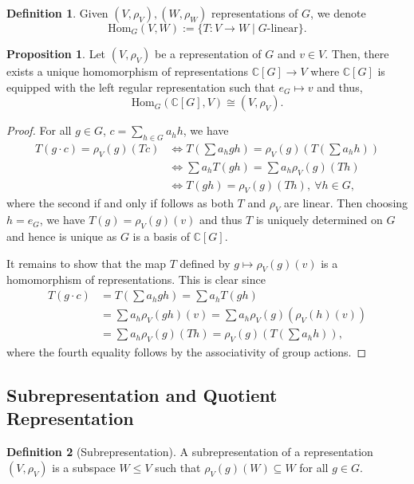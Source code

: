 \documentclass[]{article}
\theoremstyle{definition}
\theoremstyle{definition}
\newtheorem{definition}{Definition}[section]
\newtheorem{proposition}{Proposition}[section]
\begin{document}
\begin{definition}
  Given \((V, \rho_V), (W, \rho_W)\) representations of \(G\), we denote 
  \[\text{Hom}_G(V, W) := \{T : V \to W \mid G\text{-linear}\}.\]
\end{definition}

\begin{proposition}
  Let \((V, \rho_V)\) be a representation of \(G\) and \(v \in V\). Then, 
  there exists a unique homomorphism of representations 
  \(\mathbb{C}[G] \to V\) where \(\mathbb{C}[G]\) is equipped with the left 
  regular representation such that \(e_G \mapsto v\) and thus, 
  \[\text{Hom}_G(\mathbb{C}[G], V) \cong (V, \rho_V).\]
\end{proposition}
\begin{proof}
  For all \(g \in G\), \(c = \sum_{h \in G} a_h h\), we have 
  \[\begin{split}
    T(g \cdot c) = \rho_V(g)(Tc) 
    & \iff T\left(\sum a_h gh\right) = 
      \rho_V(g)\left(T\left(\sum a_h h\right)\right)\\
    & \iff \sum a_h T(gh) = \sum a_h \rho_V(g)(Th)\\
    & \iff T(gh) = \rho_V(g)(Th), \ \forall h \in G,
  \end{split}\]
  where the second if and only if follows as both \(T\) and \(\rho_V\) 
  are linear. Then choosing \(h = e_G\), we have \(T(g) = \rho_V(g)(v)\) and 
  thus \(T\) is uniquely determined on \(G\) and hence is unique as \(G\) is 
  a basis of \(\mathbb{C}[G]\).
  
  It remains to show that the map \(T\) defined by \(g \mapsto \rho_V(g)(v)\) is 
  a homomorphism of representations. This is clear since 
  \[\begin{split}
    T(g \cdot c) & = T\left(\sum a_h gh\right) = \sum a_h T(gh) \\
      & = \sum a_h \rho_V(gh)(v) = \sum a_h \rho_V(g)(\rho_V(h)(v))\\
      & = \sum a_h \rho_V(g)(Th) = \rho_V(g)\left(T\left(\sum a_h h\right)\right), 
  \end{split}\]
  where the fourth equality follows by the associativity of group actions.
\end{proof}

\subsection{Subrepresentation and Quotient Representation}

\begin{definition}[Subrepresentation]
  A subrepresentation of a representation \((V, \rho_V)\) is a subspace \(W \le V\) 
  such that \(\rho_V(g)(W) \subseteq W\) for all \(g \in G\).
\end{definition}
\end{document}
